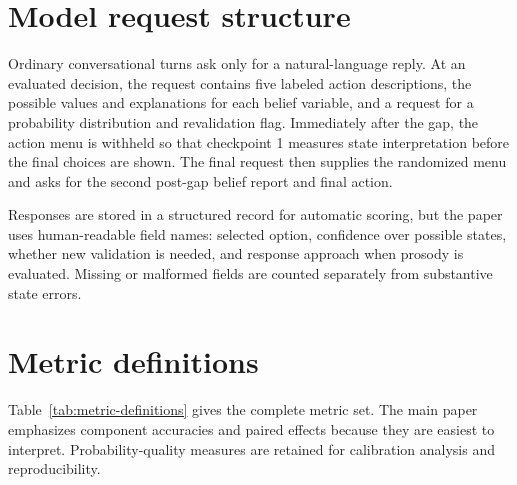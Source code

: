 \documentclass{article}
\begin{document}
\section{Model request structure}
\label{app:prompt-structure}

Ordinary conversational turns ask only for a natural-language reply. At an evaluated decision, the request contains five labeled action descriptions, the possible values and explanations for each belief variable, and a request for a probability distribution and revalidation flag. Immediately after the gap, the action menu is withheld so that checkpoint 1 measures state interpretation before the final choices are shown. The final request then supplies the randomized menu and asks for the second post-gap belief report and final action.

Responses are stored in a structured record for automatic scoring, but the paper uses human-readable field names: selected option, confidence over possible states, whether new validation is needed, and response approach when prosody is evaluated. Missing or malformed fields are counted separately from substantive state errors.

\section{Metric definitions}
\label{app:metrics}

Table~\ref{tab:metric-definitions} gives the complete metric set. The main paper emphasizes component accuracies and paired effects because they are easiest to interpret. Probability-quality measures are retained for calibration analysis and reproducibility.
\end{document}
